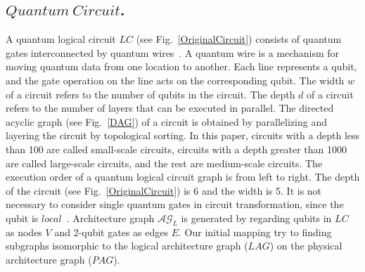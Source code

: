 \documentclass[runningheads]{llncs}
\begin{document}
 \subsection{$Quantum \ Circuit$.}
A quantum logical circuit $LC$ (see Fig.~\ref{OriginalCircuit}) 
consists of quantum gates interconnected by quantum wires~\cite{Daei2020}.
A quantum wire is a mechanism for moving quantum data from one location to another.
Each line represents a qubit, and the gate operation on the line acts on the corresponding qubit.
 The width $w$ of a circuit refers to the number of qubits in the circuit.
 The depth $d$ of a circuit refers to the number of layers that can be executed in parallel.
The directed acyclic graph (see Fig.~\ref{DAG}) of a circuit is obtained by parallelizing 
and layering the circuit by topological sorting.
In this paper, circuits with a depth less than 100 are called small-scale circuits, 
circuits with a depth greater than 1000 are called large-scale circuits, 
and the rest are medium-scale circuits.
The execution order of a quantum logical circuit graph is from left to right. 
The depth of the circuit (see Fig.~\ref{OriginalCircuit}) is 6 and the width is 5. 
It is not necessary to consider single quantum gates in circuit transformation, 
since the qubit is $local$~\cite{2013Optimization}. 
Architecture graph $\mathcal{AG}_{L}$  is generated by regarding qubits in $LC$
as nodes $V$  and 2-qubit gates as edges $E$. 
Our initial mapping try to finding subgraphs isomorphic to the logical architecture graph ($LAG$)
on the physical architecture graph ($PAG$).
\end{document}
